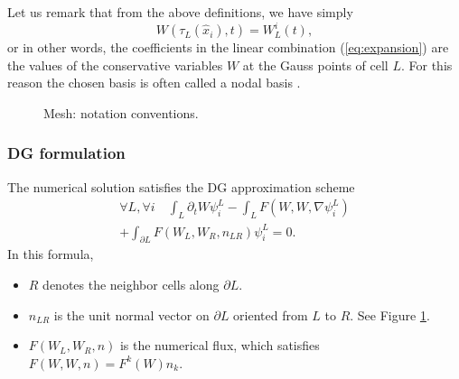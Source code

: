 \documentclass[preprint]{sig-alternate}
\begin{document}
 Let us remark that from the above definitions, we have simply
$$
W(\tau_L(\hat x_i),t)=W_L^i(t),
$$
or in other words, the coefficients in the linear combination (\ref{eq:expansion}) are the values of the conservative variables $W$ at the Gauss points of cell $L$. For this reason the chosen basis is often called a nodal basis \cite{hesthaven2007nodal}.
\begin{figure}
\centering
{}
\caption{Mesh: notation conventions.\label{fig:mesh-conv}}
\end{figure}

%

\subsubsection{DG formulation}
The numerical solution satisfies the DG approximation scheme
\begin{eqnarray}
\forall L,\forall i\quad\int_{L}\partial_{t}W\psi_{i}^{L}-\int_{L}F(W,W,\nabla\psi_{i}^{L}) \nonumber \\
+\int_{\partial L}F(W_{L},W_{R},n_{LR})\psi_{i}^{L}=0.
\label{eq:dg}
\end{eqnarray}
In this formula,
\begin{itemize}
\item $R$ denotes the neighbor cells along $\partial L$.
\item $n_{LR}$ is the unit normal vector on $\partial L$ oriented from
$L$ to $R$. See Figure \ref{fig:mesh-conv}.
\item $F(W_{L},W_{R},n)$ is the numerical flux, which satisfies $F(W,W,n)=F^{k}(W)n_{k}$.
\end{itemize}
\end{document}
